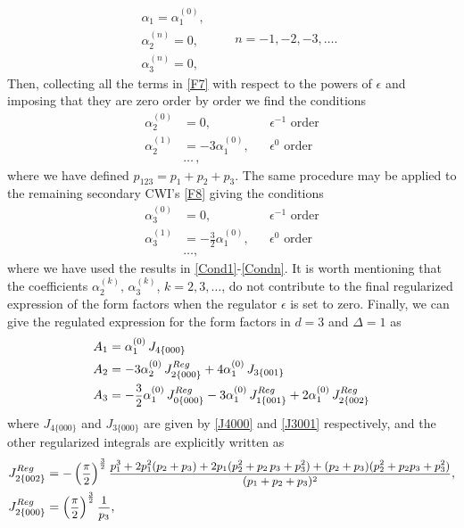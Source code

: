 \documentclass[a4paper,11pt,openright,twoside]{book}
\let\a=\alpha   \let\b=\beta   \let\g=\gamma   \let\d=\delta
\let\e=\epsilon \let\z=\zeta   \let\h=\eta     \let\q=\theta
\newcommand{\sdfrac}[2]{\mbox{\small$\displaystyle\frac{#1}{#2}$}}
\numberwithin{equation}{section}
\begin{document}
{{{\begin{equation}
	\begin{split}
		&\a_1=\a_1^{(0)},\\
		&\a_2^{(n)}=0,\\
		&\a_3^{(n)}=0,
	\end{split}
	\qquad n=-1,-2,-3,\dots.
\end{equation}
Then, collecting all the terms in \eqref{F7} with respect to the powers of $\e$ and imposing that they are zero order by order we find the conditions
\begin{align}
	\a_2^{(0)}&=0,&&\text{$\e^{-1}$ order}\label{Cond1}\\
	\a_2^{(1)}&=-3\a_1^{(0)},&&\text{$\e^0$ order}\label{Cond2}\\
	&\dots\,,\label{Condn}
\end{align}
where we have defined $p_{123}=p_1+p_2+p_3$. 
The same procedure may be applied to the remaining secondary CWI's \eqref{F8} giving the conditions
\begin{align}
	\a_3^{(0)}&=0,&&\text{$\e^{-1}$ order}\label{Cond10}\\
	\a_3^{(1)}&=-\frac{3}{2}\a_1^{(0)},&&\text{$\e^{0}$ order}\label{Cond11}\\
	&\dots,
\end{align}
where we have used the results in \eqref{Cond1}-\eqref{Condn}. It is worth mentioning that the coefficients $\alpha_2^{(k)},\,\alpha_3^{(k)}$, $k=2,3,\dots$, do not contribute to the final regularized expression of the form factors when the regulator $\e$ is set to zero. Finally, we can give the regulated expression for the form factors in $d=3$ and $\Delta=1$ as
\begin{align}
	A_1&=\a_1^{(0)}\,J_{4\{000\}}\\
	A_2&=-3\a_2^{(0)}\,J^{Reg}_{2\{000\}}+4\a_{1}^{(0)}\,J_{3\{001\}}\\
	A_3&=-\sdfrac{3}{2}\a_1^{(0)}\,J^{Reg}_{0\{000\}}-3\a_{1}^{(0)}\,J^{Reg}_{1\{001\}}+2\a_{1}^{(0)}\,J^{Reg}_{2\{002\}}
\end{align}
where $J_{4\{000\}}$ and $J_{3\{000\}}$ are given by \eqref{J4000} and \eqref{J3001} respectively, and the other regularized integrals are explicitly written as
\begin{align}
	J^{Reg}_{2\{002\}}&=-\left(\sdfrac{\pi}{2}\right)^\frac{3}{2}\sdfrac{p_1^3+2p_1^2(p_2+p_3)+2p_1(p_2^2+p_2\,p_3+p_3^2)+(p_2+p_3)(p_2^2+p_2p_3+p_3^2)}{(p_1+p_2+p_3)^2},\\
	J^{Reg}_{2\{000\}}&=\left(\sdfrac{\pi}{2}\right)^\frac{3}{2}\sdfrac{1}{p_3},\\

\end{align}}}}
\end{document}

